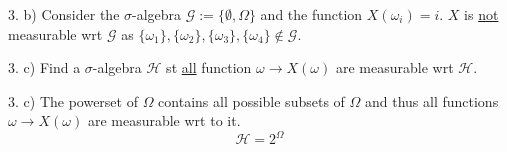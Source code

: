 \documentclass[11pt,a4paper]{article}
\begin{document}
\begin{answer}{3. b)}
  Consider the $\sigma$-algebra $\mathcal{G}:=\{\emptyset,\Omega\}$ and the function $X(\omega_i)=i$. $X$ is \underline{not} measurable wrt $\mathcal{G}$ as $\{\omega_1\},\{\omega_2\},\{\omega_3\},\{\omega_4\}\not\in\mathcal{G}$.
\end{answer}

\begin{question}{3. c)}
  Find a $\sigma$-algebra $\mathcal{H}$ st \underline{all} function $\omega\to X(\omega)$ are measurable wrt $\mathcal{H}$.
\end{question}

\begin{answer}{3. c)}
  The powerset of $\Omega$ contains all possible subsets of $\Omega$ and thus all functions $\omega\to X(\omega)$ are measurable wrt to it.
  \[ \mathcal{H}=2^\Omega \]
\end{answer}
\end{document}

